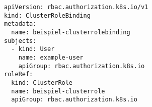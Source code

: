 \begin{verbatim}
apiVersion: rbac.authorization.k8s.io/v1
kind: ClusterRoleBinding
metadata:
  name: beispiel-clusterrolebinding
subjects:
  - kind: User
    name: example-user
    apiGroup: rbac.authorization.k8s.io
roleRef:
  kind: ClusterRole
  name: beispiel-clusterrole
  apiGroup: rbac.authorization.k8s.io
\end{verbatim}